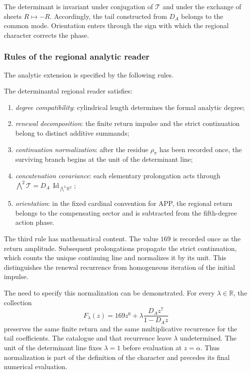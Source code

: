The determinant is invariant under conjugation of \(\mathcal T\) and
under the exchange of sheets \(R\mapsto-R\). Accordingly, the tail
constructed from \(D_A\) belongs to the common mode. Orientation enters
through the sign with which the regional character corrects the phase.

\subsubsection{Rules of the regional analytic reader}

The analytic extension is specified by the following rules.

\begin{definition}
\label{p12-83-c13-s3:def:lector-regional-determinantal}
The determinantal regional reader satisfies:
\begin{enumerate}
  \item \emph{degree compatibility}: cylindrical length determines the
  formal analytic degree;
  \item \emph{renewal decomposition}: the finite return impulse and the
  strict continuation belong to distinct additive summands;
  \item \emph{continuation normalization}: after the residue
  \(\rho_\pi\) has been recorded once, the surviving branch begins at the
  unit of the determinant line;
  \item \emph{concatenation covariance}: each elementary prolongation
  acts through
  \(\bigwedge^2\mathcal T=D_A\,\operatorname{Id}_{\bigwedge^2\mathbb R^2}\);
  \item \emph{orientation}: in the fixed cardinal convention for APP,
  the regional return belongs to the compensating sector and is
  subtracted from the fifth-degree action phase.
\end{enumerate}
\end{definition}

The third rule has mathematical content. The value \(169\) is recorded
once as the return amplitude. Subsequent prolongations propagate the
strict continuation, which counts the unique continuing line and
normalizes it by its unit. This distinguishes the renewal recurrence
from homogeneous iteration of the initial impulse.

The need to specify this normalization can be demonstrated. For every
\(\lambda\in\mathbb R\), the collection
\[
F_\lambda(z)
=169z^6+\lambda\frac{D_Az^7}{1-D_Az}
\]
preserves the same finite return and the same multiplicative recurrence for
the tail coefficients. The catalogue and that recurrence leave
\(\lambda\) undetermined. The unit of the determinant line fixes
\(\lambda=1\) before evaluation at \(z=\alpha\). Thus normalization is
part of the definition of the character and precedes its final numerical
evaluation.
